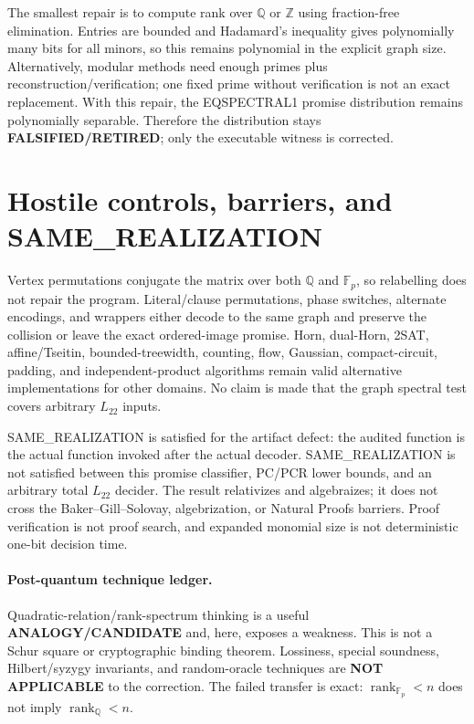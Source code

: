 \documentclass[11pt]{article}
\newcommand{\RET}{\textbf{FALSIFIED/RETIRED}}
\newcommand{\Ltwo}{L_{22}}
\begin{document}
The smallest repair is to compute rank over $\mathbb Q$ or $\mathbb Z$ using
fraction-free elimination.  Entries are bounded and Hadamard's inequality
gives polynomially many bits for all minors, so this remains polynomial in the
explicit graph size.  Alternatively, modular methods need enough primes plus
reconstruction/verification; one fixed prime without verification is not an
exact replacement.  With this repair, the EQSPECTRAL1 promise distribution
remains polynomially separable.  Therefore the distribution stays \RET{};
only the executable witness is corrected.

\section{Hostile controls, barriers, and SAME\_REALIZATION}
Vertex permutations conjugate the matrix over both $\mathbb Q$ and
$\mathbb F_p$, so relabelling does not repair the program.  Literal/clause
permutations, phase switches, alternate encodings, and wrappers either decode
to the same graph and preserve the collision or leave the exact ordered-image
promise.  Horn, dual-Horn, 2SAT, affine/Tseitin, bounded-treewidth, counting,
flow, Gaussian, compact-circuit, padding, and independent-product algorithms
remain valid alternative implementations for other domains.  No claim is
made that the graph spectral test covers arbitrary $\Ltwo$ inputs.

SAME\_REALIZATION is satisfied for the artifact defect: the audited function
is the actual function invoked after the actual decoder.  SAME\_REALIZATION
is not satisfied between this promise classifier, PC/PCR lower bounds, and an
arbitrary total $\Ltwo$ decider.  The result relativizes and algebraizes; it
does not cross the Baker--Gill--Solovay, algebrization, or Natural Proofs
barriers.  Proof verification is not proof search, and expanded monomial size
is not deterministic one-bit decision time.

\paragraph{Post-quantum technique ledger.}
Quadratic-relation/rank-spectrum thinking is a useful
\textbf{ANALOGY/CANDIDATE} and, here, exposes a weakness.  This is not a Schur
square or cryptographic binding theorem.  Lossiness, special soundness,
Hilbert/syzygy invariants, and random-oracle techniques are
\textbf{NOT APPLICABLE} to the correction.  The failed transfer is exact:
$\operatorname{rank}_{\mathbb F_p}<n$ does not imply
$\operatorname{rank}_{\mathbb Q}<n$.
\end{document}
